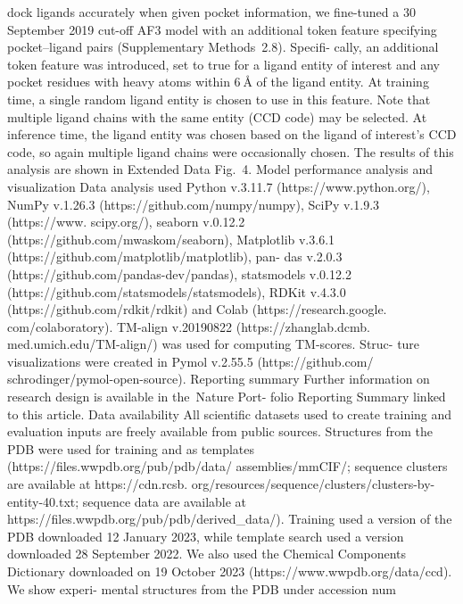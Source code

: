 dock ligands accurately when given pocket information, we fine-tuned
a 30 September 2019 cut-off AF3 model with an additional token feature
specifying pocket–ligand pairs (Supplementary Methods 2.8). Specifi-
cally, an additional token feature was introduced, set to true for a ligand
entity of interest and any pocket residues with heavy atoms within 6 Å
of the ligand entity. At training time, a single random ligand entity is
chosen to use in this feature. Note that multiple ligand chains with the
same entity (CCD code) may be selected. At inference time, the ligand
entity was chosen based on the ligand of interest’s CCD code, so again
multiple ligand chains were occasionally chosen. The results of this
analysis are shown in Extended Data Fig. 4.
Model performance analysis and visualization
Data analysis used Python v.3.11.7 (https://www.python.org/), NumPy
v.1.26.3 (https://github.com/numpy/numpy), SciPy v.1.9.3 (https://www.
scipy.org/), seaborn v.0.12.2 (https://github.com/mwaskom/seaborn),
Matplotlib v.3.6.1 (https://github.com/matplotlib/matplotlib), pan-
das v.2.0.3 (https://github.com/pandas-dev/pandas), statsmodels
v.0.12.2 (https://github.com/statsmodels/statsmodels), RDKit v.4.3.0
(https://github.com/rdkit/rdkit) and Colab (https://research.google.
com/colaboratory). TM-align v.20190822 (https://zhanglab.dcmb.
med.umich.edu/TM-align/) was used for computing TM-scores. Struc-
ture visualizations were created in Pymol v.2.55.5 (https://github.com/
schrodinger/pymol-open-source).
Reporting summary
Further information on research design is available in the Nature Port-
folio Reporting Summary linked to this article.
Data availability
All scientific datasets used to create training and evaluation inputs are
freely available from public sources. Structures from the PDB were used
for training and as templates (https://files.wwpdb.org/pub/pdb/data/
assemblies/mmCIF/; sequence clusters are available at https://cdn.rcsb.
org/resources/sequence/clusters/clusters-by-entity-40.txt; sequence
data are available at https://files.wwpdb.org/pub/pdb/derived\_data/).
Training used a version of the PDB downloaded 12 January 2023, while
template search used a version downloaded 28 September 2022. We
also used the Chemical Components Dictionary downloaded on 19
October 2023 (https://www.wwpdb.org/data/ccd). We show experi-
mental structures from the PDB under accession num

